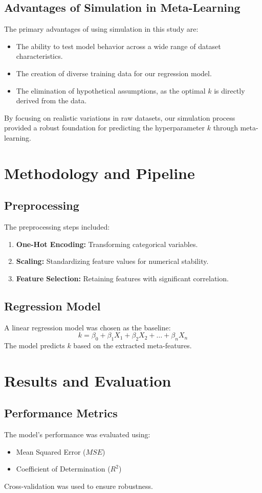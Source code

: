 \documentclass[a4paper,11pt]{article}
\begin{document}
\subsection{Advantages of Simulation in Meta-Learning}
The primary advantages of using simulation in this study are:
\begin{itemize}
    \item The ability to test model behavior across a wide range of dataset characteristics.
    \item The creation of diverse training data for our regression model.
    \item The elimination of hypothetical assumptions, as the optimal \(k\) is directly derived from the data.
\end{itemize}

By focusing on realistic variations in raw datasets, our simulation process provided a robust foundation for predicting the hyperparameter \(k\) through meta-learning.
\section{Methodology and Pipeline}
\subsection{Preprocessing}
The preprocessing steps included:
\begin{enumerate}
    \item \textbf{One-Hot Encoding:} Transforming categorical variables.
    \item \textbf{Scaling:} Standardizing feature values for numerical stability.
    \item \textbf{Feature Selection:} Retaining features with significant correlation.
\end{enumerate}

\subsection{Regression Model}
A linear regression model was chosen as the baseline:
\[
k = \beta_0 + \beta_1 X_1 + \beta_2 X_2 + \dots + \beta_n X_n
\]
The model predicts \(k\) based on the extracted meta-features.

\section{Results and Evaluation}
\subsection{Performance Metrics}
The model's performance was evaluated using:
\begin{itemize}
    \item Mean Squared Error (\(MSE\))
    \item Coefficient of Determination (\(R^2\))
\end{itemize}
Cross-validation was used to ensure robustness.
\end{document}
